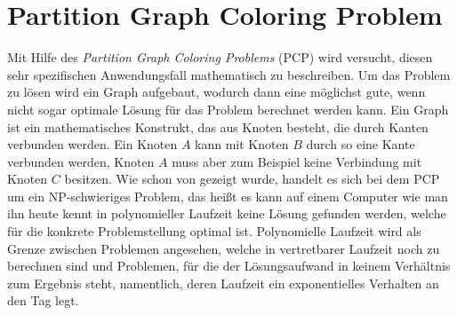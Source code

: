 \section{Partition Graph Coloring Problem}
Mit Hilfe des \textit{Partition Graph Coloring Problems} (PCP) wird versucht, diesen sehr spezifischen Anwendungsfall mathematisch zu beschreiben. Um das Problem zu lösen wird ein Graph aufgebaut, wodurch dann eine möglichst gute, wenn nicht sogar optimale Lösung für das Problem berechnet werden kann. Ein Graph ist ein mathematisches Konstrukt, das aus Knoten besteht, die durch Kanten verbunden werden. Ein Knoten $A$ kann mit Knoten $B$ durch so eine Kante verbunden werden, Knoten $A$ muss aber zum Beispiel keine Verbindung mit Knoten $C$ besitzen. Wie schon von \citet*{Li2000} gezeigt wurde, handelt es sich bei dem PCP um ein NP-schwieriges Problem, das heißt es kann auf einem Computer wie man ihn heute kennt in polynomieller Laufzeit keine Lösung gefunden werden, welche für die konkrete Problemstellung optimal ist. Polynomielle Laufzeit wird als Grenze zwischen Problemen angesehen, welche in vertretbarer Laufzeit noch zu berechnen sind und Problemen, für die der Lösungsaufwand in keinem Verhältnis zum Ergebnis steht, namentlich, deren Laufzeit ein exponentielles Verhalten an den Tag legt.

